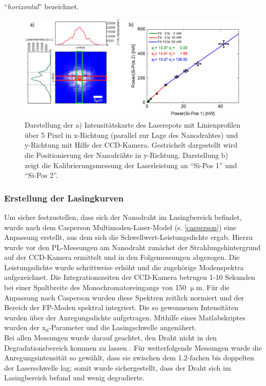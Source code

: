 ``\textit{horizontal}'' bezeichnet. \begin{figure} \centering
\includegraphics[width=1\textwidth]{Bilder/Methodik/spotsize}
\caption{Darstellung der a) Intensitätskarte des Laserspots mit Linienprofilen
über 5 Pixel in x-Richtung (parallel zur Lage des Nanodrahtes) und y-Richtung
mit Hilfe der CCD-Kamera. Gestrichelt dargestellt wird die Positionierung der
Nanodrähte in y-Richtung. Darstellung b) zeigt die Kalibrierungsmessung der
Laserleistung an ``Si-Pos 1'' und ``Si-Pos 2''.} \label{laserspot} \end{figure}
\subsubsection{Erstellung der Lasingkurven} Um sicher festzustellen, dass sich
der Nanodraht im Lasingbereich befindet, wurde nach dem Casperson
Multimoden-Laser-Model (s. \autoref{casperson}) eine Anpassung erstellt, aus dem
sich die Schwellwert-Leistungsdichte ergab. Hierzu wurde vor den PL-Messungen am
Nanodraht zunächst der Strahlungshintergrund auf der CCD-Kamera ermittelt und in
den Folgemessungen abgezogen. Die Leistungsdichte wurde schrittweise erhöht und
die zugehörige Modenspektra aufgezeichnet. Die Integrationszeiten der CCD-Kamera
betrugen 1-10 Sekunden bei einer Spaltbreite des Monochromatoreingangs von 150
$\upmu$m. Für die Anpassung nach Casperson wurden diese Spektren zeitlich
normiert und der Bereich der FP-Moden spektral integriert. Die so gewonnenen
Intensitäten wurden über der Anregungsdichte aufgetragen. Mithilfe eines
Matlabskriptes wurden der x$_\text{0}$-Parameter und die Lasingschwelle
angenähert.\\ Bei allen Messungen wurde darauf geachtet, den Draht nicht in den
Degradationsbereich kommen zu lassen \cite{Zapf.2017}. Für weiterfolgende
Messungen wurde die Anregungsintensität so gewählt, dass sie zwischen dem
1.2-fachen bis doppelten der Laserschwelle lag; somit wurde sichergestellt, dass
der Draht sich im Lasingbereich befand und wenig degradierte.
